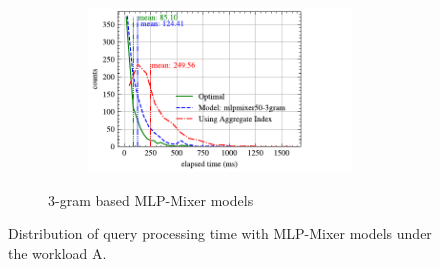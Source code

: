 \documentclass[conference]{IEEEtran}
\begin{document}
\begin{figure}[!h]
\begin{subfigure}{0.45\textwidth}
\begin{subfigure}{\textwidth}
		\end{subfigure}
		\vfill
		\begin{subfigure}{\textwidth}
			\centering
			\includegraphics[]{graphics/perf_dist_mlpmixer50_3gram_A.pdf}
		\end{subfigure}
		\caption{3-gram based MLP-Mixer models}
	\end{subfigure}
	\caption{Distribution of query processing time with MLP-Mixer models under the workload A.}
	\label{fig:mlpmixer_perf_all_A}
\end{figure}
\end{document}
